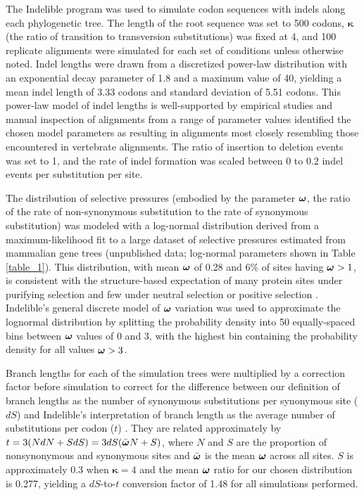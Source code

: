\documentclass{article}
\begin{document}
The Indelible program \citep{Fletcher2009INDELible} was used to
simulate codon sequences with indels along each phylogenetic tree. The
length of the root sequence was set to 500 codons, $\bm{\kappa}$ (the
ratio of transition to transversion substitutions) was fixed at 4, and
100 replicate alignments were simulated for each set of conditions
unless otherwise noted. Indel lengths were drawn from a discretized
power-law distribution with an exponential decay parameter of 1.8 and
a maximum value of 40, yielding a mean indel length of 3.33 codons and
standard deviation of 5.51 codons. This power-law model of indel
lengths is well-supported by empirical studies
\citep{Benner1993Empirical,Cartwright2009Problems} and manual
inspection of alignments from a range of parameter values identified
the chosen model parameters as resulting in alignments most closely
resembling those encountered in vertebrate alignments. The ratio of
insertion to deletion events was set to 1, and the rate of indel
formation was scaled between 0 to 0.2 indel events per substitution
per site.

The distribution of \sw selective pressures (embodied by the parameter
$\bm{\omega}$, the ratio of the rate of non-synonymous substitution to the
rate of synonymous substitution) was modeled with a log-normal
distribution derived from a maximum-likelihood fit to a large dataset
of \sw selective pressures estimated from mammalian gene trees
(unpublished data; log-normal parameters shown in Table
\ref{table_1}). This distribution, with mean $\bm{\omega}$ of 0.28 and 6\% of
sites having $\bm{\omega}>1$, is consistent with the structure-based
expectation of many protein sites under purifying selection and few
under neutral selection or positive selection
\citep{Smith1970Natural,Kimura1974SomePrinciples}. Indelible's general
discrete model of \sw $\bm{\omega}$ variation was used to approximate the
lognormal distribution by splitting the probability density into 50
equally-spaced bins between $\bm{\omega}$ values of 0 and 3, with the highest
bin containing the probability density for all values $\bm{\omega}>3$.

Branch lengths for each of the simulation trees were multiplied by a
correction factor before simulation to correct for the difference
between our definition of branch lengths as the number of synonymous
substitutions per synonymous site ($dS$) and Indelible's
interpretation of branch length as the average number of substitutions
per codon ($t$) \citep{Fletcher2010Effect}. They are related
approximately by $t=3(NdN+SdS) = 3dS(\bar{\bm{\omega}{}}N+S)$, where $N$ and
$S$ are the proportion of nonsynonymous and synonymous sites and
$\bar{\bm{\omega}}$ is the mean $\bm{\omega}$ across all sites. $S$ is approximately 0.3
when $\bm{\kappa}=4$ \citep{Yang1998Synonymous} and the mean $\bm{\omega}$ ratio for our chosen
distribution is 0.277, yielding a $dS$-to-$t$ conversion factor of
1.48 for all simulations performed.
\end{document}
